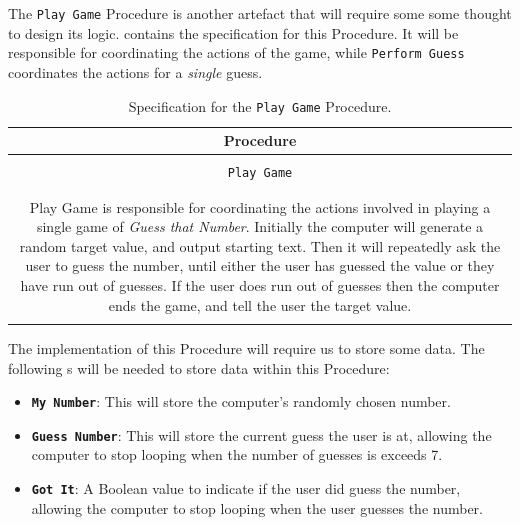 The \texttt{Play Game} Procedure is another artefact that will require some some thought to design its logic.  contains the specification for this Procedure. It will be responsible for coordinating the actions of the game, while \texttt{Perform Guess} coordinates the actions for a \emph{single} guess.

\begin{table}[h]
  \centering
  \begin{tabular}{|c|p{9cm}|}
    \hline
    \multicolumn{2}{|c|}{\textbf{Procedure}} \\
    \hline
    \multicolumn{2}{|c|}{} \\
    \multicolumn{2}{|c|}{\texttt{Play Game}} \\
    \multicolumn{2}{|c|}{} \\
    \hline
    \multicolumn{2}{|c|}{} \\
    \multicolumn{2}{|p{12cm}|}{Play Game is responsible for coordinating the actions involved in playing a single game of \emph{Guess that Number}. Initially the computer will generate a random target value, and output starting text. Then it will repeatedly ask the user to guess the number, until either the user has guessed the value or they have run out of guesses. If the user does run out of guesses then the computer ends the game, and tell the user the target value.} \\
    \multicolumn{2}{|c|}{} \\
    \hline
  \end{tabular}
  \caption{Specification for the \texttt{Play Game} Procedure.}
  \label{tbl:play game}
\end{table}

The implementation of this Procedure will require us to store some data. The following s will be needed to store data within this Procedure:
\begin{itemize}
  \item \texttt{\textbf{My Number}}: This will store the computer's randomly chosen number.
  \item \texttt{\textbf{Guess Number}}: This will store the current guess the user is at, allowing the computer to stop looping when the number of guesses is exceeds 7.
  \item \texttt{\textbf{Got It}}: A Boolean value to indicate if the user did guess the number, allowing the computer to stop looping when the user guesses the number.
\end{itemize}

